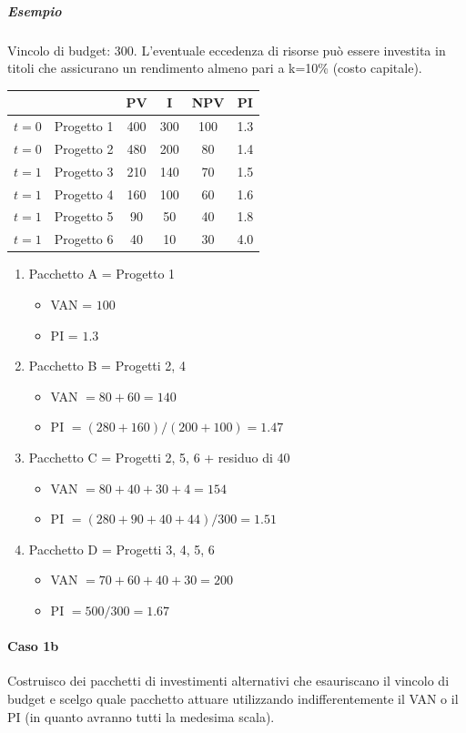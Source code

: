 \subparagraph{Esempio} Vincolo di budget: 300. L’eventuale eccedenza di risorse può essere investita in titoli che assicurano un
rendimento almeno pari a k=10\% (costo capitale).

\vspace{1em}
\begin{tabular}{|l|l|c|c|c|c|}
	\hline
	\grayrow & & PV & I & NPV & PI \\
	\hline
	$t=0$ & Progetto 1 & 400 & 300 & 100 & 1.3 \\
	$t=0$ & Progetto 2 & 480 & 200 & 80 & 1.4 \\
	\hline
	$t=1$ & Progetto 3 & 210 & 140 & 70 & 1.5 \\
	$t=1$ & Progetto 4 & 160 & 100 & 60 & 1.6 \\
	$t=1$ & Progetto 5  & 90 & 50 & 40 & 1.8 \\
	$t=1$ & Progetto 6 & 40 & 10 & 30 & 4.0 \\
	\hline
\end{tabular}

\begin{enumerate}
	\item Pacchetto A = Progetto 1
	\begin{itemize}
		\item VAN = $100$
		\item PI = $1.3$
	\end{itemize}
	\item Pacchetto B = Progetti 2, 4
	\begin{itemize}
		\item VAN $= 80 + 60 = 140$
		\item PI $= (280 + 160) / (200 + 100) = 1.47$
	\end{itemize}
	\item Pacchetto C = Progetti 2, 5, 6 + residuo di 40
	\begin{itemize}
		\item VAN $= 80 + 40 + 30 + 4 = 154$
		\item PI $= (280 + 90 + 40 + 44) / 300 = 1.51$
	\end{itemize}
	\item Pacchetto D = Progetti 3, 4, 5, 6
	\begin{itemize}
		\item VAN $= 70 + 60 + 40 + 30 = 200$
		\item PI $= 500 / 300 = 1.67$
	\end{itemize}
\end{enumerate}

\paragraph{Caso 1b}	Costruisco dei pacchetti di investimenti alternativi che esauriscano il vincolo di budget e scelgo
quale pacchetto attuare utilizzando indifferentemente il VAN o il PI (in quanto avranno tutti la medesima
scala).

